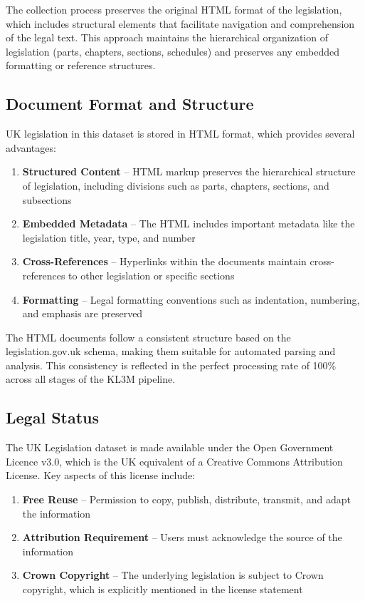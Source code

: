 The collection process preserves the original HTML format of the legislation, which includes structural elements that facilitate navigation and comprehension of the legal text. This approach maintains the hierarchical organization of legislation (parts, chapters, sections, schedules) and preserves any embedded formatting or reference structures.

\subsection{Document Format and Structure}

UK legislation in this dataset is stored in HTML format, which provides several advantages:

\begin{enumerate}
    \item \textbf{Structured Content} -- HTML markup preserves the hierarchical structure of legislation, including divisions such as parts, chapters, sections, and subsections
    
    \item \textbf{Embedded Metadata} -- The HTML includes important metadata like the legislation title, year, type, and number
    
    \item \textbf{Cross-References} -- Hyperlinks within the documents maintain cross-references to other legislation or specific sections
    
    \item \textbf{Formatting} -- Legal formatting conventions such as indentation, numbering, and emphasis are preserved
\end{enumerate}

The HTML documents follow a consistent structure based on the legislation.gov.uk schema, making them suitable for automated parsing and analysis. This consistency is reflected in the perfect processing rate of 100\% across all stages of the KL3M pipeline.

\subsection{Legal Status}

The UK Legislation dataset is made available under the Open Government Licence v3.0, which is the UK equivalent of a Creative Commons Attribution License. Key aspects of this license include:

\begin{enumerate}
    \item \textbf{Free Reuse} -- Permission to copy, publish, distribute, transmit, and adapt the information
    
    \item \textbf{Attribution Requirement} -- Users must acknowledge the source of the information
    
    \item \textbf{Crown Copyright} -- The underlying legislation is subject to Crown copyright, which is explicitly mentioned in the license statement
\end{enumerate}

